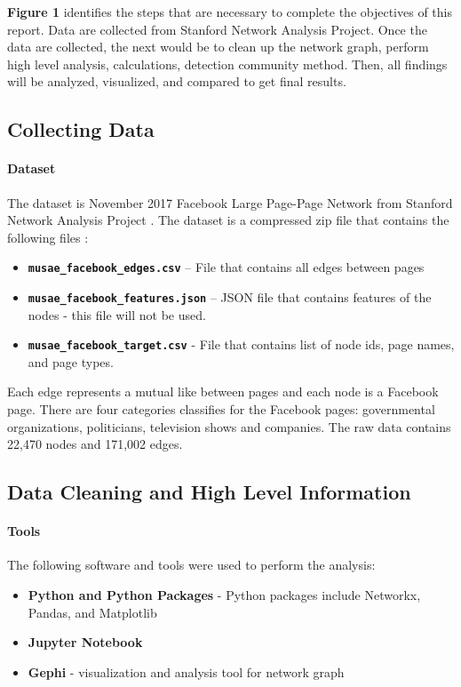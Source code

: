 \documentclass[11pt,twocolumn]{article}
\begin{document}
\textbf{Figure 1} identifies the steps that are necessary to complete the objectives of this report. Data are collected from Stanford Network Analysis Project. Once the data are collected, the next would be to clean up the network graph, perform high level analysis, calculations, detection community method. Then, all findings will be analyzed, visualized, and compared to get final results.

\subsection{Collecting Data}

\paragraph{Dataset \cite{page-page-network-ds}}
The dataset is November 2017 Facebook Large Page-Page Network from Stanford Network Analysis Project \cite{page-page-network-ds}. The dataset is a compressed zip file that contains the following files :
\begin{itemize}
\item\textbf{\texttt{musae\_facebook\_edges.csv}} – File that contains all edges between pages
\item\textbf{\texttt{musae\_facebook\_features.json}} – JSON file that contains features of the nodes - this file will not be used.
\item\textbf{\texttt{musae\_facebook\_target.csv}} - File that contains list of node ids, page names, and page types.
\end{itemize}

Each edge represents a mutual like between pages and each node is a Facebook page. There are four categories classifies for the Facebook pages: governmental organizations, politicians, television shows and companies. The raw data contains 22,470 nodes and 171,002 edges. 

\subsection{Data Cleaning and High Level Information}

\paragraph{Tools}
The following software and tools were used to perform the analysis:
\begin{itemize}
\item \textbf{Python and Python Packages} - Python packages include Networkx, Pandas, and Matplotlib
\item \textbf{Jupyter Notebook}
\item \textbf{Gephi} - visualization and analysis tool for network graph
\end{itemize}
\end{document}
